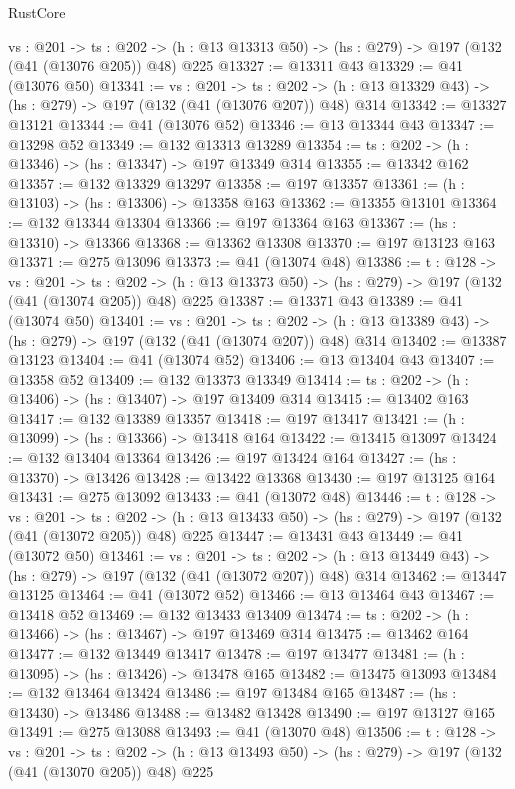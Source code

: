 \begin{lexlean}{RustCore}
\begin{coremodule}
  {vs : @201} ->
  {ts : @202} -> (h : @13 @13313 @50) -> (hs : @279) -> @197 (@132 (@41 (@13076 @205)) @48) @225
@13327 := @13311 @43
@13329 := @41 (@13076 @50)
@13341 := {vs : @201} ->
  {ts : @202} -> (h : @13 @13329 @43) -> (hs : @279) -> @197 (@132 (@41 (@13076 @207)) @48) @314
@13342 := @13327 @13121
@13344 := @41 (@13076 @52)
@13346 := @13 @13344 @43
@13347 := @13298 @52
@13349 := @132 @13313 @13289
@13354 := {ts : @202} -> (h : @13346) -> (hs : @13347) -> @197 @13349 @314
@13355 := @13342 @162
@13357 := @132 @13329 @13297
@13358 := @197 @13357
@13361 := (h : @13103) -> (hs : @13306) -> @13358 @163
@13362 := @13355 @13101
@13364 := @132 @13344 @13304
@13366 := @197 @13364 @163
@13367 := (hs : @13310) -> @13366
@13368 := @13362 @13308
@13370 := @197 @13123 @163
@13371 := @275 @13096
@13373 := @41 (@13074 @48)
@13386 := {t : @128} ->
  {vs : @201} ->
  {ts : @202} -> (h : @13 @13373 @50) -> (hs : @279) -> @197 (@132 (@41 (@13074 @205)) @48) @225
@13387 := @13371 @43
@13389 := @41 (@13074 @50)
@13401 := {vs : @201} ->
  {ts : @202} -> (h : @13 @13389 @43) -> (hs : @279) -> @197 (@132 (@41 (@13074 @207)) @48) @314
@13402 := @13387 @13123
@13404 := @41 (@13074 @52)
@13406 := @13 @13404 @43
@13407 := @13358 @52
@13409 := @132 @13373 @13349
@13414 := {ts : @202} -> (h : @13406) -> (hs : @13407) -> @197 @13409 @314
@13415 := @13402 @163
@13417 := @132 @13389 @13357
@13418 := @197 @13417
@13421 := (h : @13099) -> (hs : @13366) -> @13418 @164
@13422 := @13415 @13097
@13424 := @132 @13404 @13364
@13426 := @197 @13424 @164
@13427 := (hs : @13370) -> @13426
@13428 := @13422 @13368
@13430 := @197 @13125 @164
@13431 := @275 @13092
@13433 := @41 (@13072 @48)
@13446 := {t : @128} ->
  {vs : @201} ->
  {ts : @202} -> (h : @13 @13433 @50) -> (hs : @279) -> @197 (@132 (@41 (@13072 @205)) @48) @225
@13447 := @13431 @43
@13449 := @41 (@13072 @50)
@13461 := {vs : @201} ->
  {ts : @202} -> (h : @13 @13449 @43) -> (hs : @279) -> @197 (@132 (@41 (@13072 @207)) @48) @314
@13462 := @13447 @13125
@13464 := @41 (@13072 @52)
@13466 := @13 @13464 @43
@13467 := @13418 @52
@13469 := @132 @13433 @13409
@13474 := {ts : @202} -> (h : @13466) -> (hs : @13467) -> @197 @13469 @314
@13475 := @13462 @164
@13477 := @132 @13449 @13417
@13478 := @197 @13477
@13481 := (h : @13095) -> (hs : @13426) -> @13478 @165
@13482 := @13475 @13093
@13484 := @132 @13464 @13424
@13486 := @197 @13484 @165
@13487 := (hs : @13430) -> @13486
@13488 := @13482 @13428
@13490 := @197 @13127 @165
@13491 := @275 @13088
@13493 := @41 (@13070 @48)
@13506 := {t : @128} ->
  {vs : @201} ->
  {ts : @202} -> (h : @13 @13493 @50) -> (hs : @279) -> @197 (@132 (@41 (@13070 @205)) @48) @225

\end{coremodule}
\end{lexlean}
